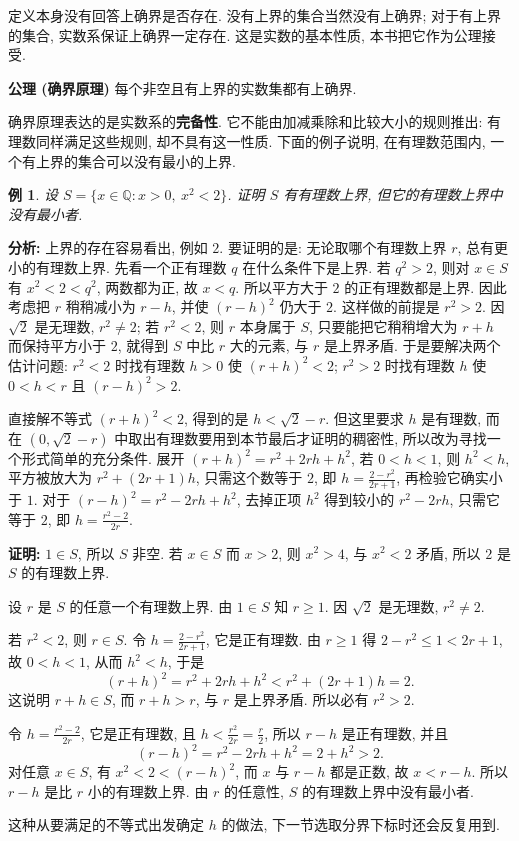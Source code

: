 \documentclass[UTF8,openany]{ctexbook}
\theoremstyle{chinesetextbook}
\newtheorem{example}{例}[section]
\newenvironment{cnproof}{\par\indent\textbf{证明:} \ignorespaces}{\par}
\begin{document}
定义本身没有回答上确界是否存在. 没有上界的集合当然没有上确界; 对于有上界的集合, 实数系保证上确界一定存在. 这是实数的基本性质, 本书把它作为公理接受.

\par\indent\textbf{公理 (确界原理)} 每个非空且有上界的实数集都有上确界.

确界原理表达的是实数系的\textbf{完备性}. 它不能由加减乘除和比较大小的规则推出: 有理数同样满足这些规则, 却不具有这一性质. 下面的例子说明, 在有理数范围内, 一个有上界的集合可以没有最小的上界.
\begin{example}
设 $S=\{x\in\mathbb Q:x>0,\ x^2<2\}$. 证明 $S$ 有有理数上界, 但它的有理数上界中没有最小者.
\end{example}
\par\indent\textbf{分析:} 上界的存在容易看出, 例如 $2$. 要证明的是: 无论取哪个有理数上界 $r$, 总有更小的有理数上界. 先看一个正有理数 $q$ 在什么条件下是上界. 若 $q^2>2$, 则对 $x\in S$ 有 $x^2<2<q^2$, 两数都为正, 故 $x<q$. 所以平方大于 $2$ 的正有理数都是上界. 因此考虑把 $r$ 稍稍减小为 $r-h$, 并使 $(r-h)^2$ 仍大于 $2$. 这样做的前提是 $r^2>2$. 因 $\sqrt2$ 是无理数, $r^2\ne2$; 若 $r^2<2$, 则 $r$ 本身属于 $S$, 只要能把它稍稍增大为 $r+h$ 而保持平方小于 $2$, 就得到 $S$ 中比 $r$ 大的元素, 与 $r$ 是上界矛盾. 于是要解决两个估计问题: $r^2<2$ 时找有理数 $h>0$ 使 $(r+h)^2<2$; $r^2>2$ 时找有理数 $h$ 使 $0<h<r$ 且 $(r-h)^2>2$.

直接解不等式 $(r+h)^2<2$, 得到的是 $h<\sqrt2-r$. 但这里要求 $h$ 是有理数, 而在 $(0,\sqrt2-r)$ 中取出有理数要用到本节最后才证明的稠密性, 所以改为寻找一个形式简单的充分条件. 展开 $(r+h)^2=r^2+2rh+h^2$, 若 $0<h<1$, 则 $h^2<h$, 平方被放大为 $r^2+(2r+1)h$, 只需这个数等于 $2$, 即 $\displaystyle h=\frac{2-r^2}{2r+1}$, 再检验它确实小于 $1$. 对于 $(r-h)^2=r^2-2rh+h^2$, 去掉正项 $h^2$ 得到较小的 $r^2-2rh$, 只需它等于 $2$, 即 $\displaystyle h=\frac{r^2-2}{2r}$.
\begin{cnproof}
$1\in S$, 所以 $S$ 非空. 若 $x\in S$ 而 $x>2$, 则 $x^2>4$, 与 $x^2<2$ 矛盾, 所以 $2$ 是 $S$ 的有理数上界.

设 $r$ 是 $S$ 的任意一个有理数上界. 由 $1\in S$ 知 $r\ge1$. 因 $\sqrt2$ 是无理数, $r^2\ne2$.

若 $r^2<2$, 则 $r\in S$. 令 $\displaystyle h=\frac{2-r^2}{2r+1}$, 它是正有理数. 由 $r\ge1$ 得 $2-r^2\le1<2r+1$, 故 $0<h<1$, 从而 $h^2<h$, 于是
\[
(r+h)^2=r^2+2rh+h^2<r^2+(2r+1)h=2.
\]
这说明 $r+h\in S$, 而 $r+h>r$, 与 $r$ 是上界矛盾. 所以必有 $r^2>2$.

令 $\displaystyle h=\frac{r^2-2}{2r}$, 它是正有理数, 且 $\displaystyle h<\frac{r^2}{2r}=\frac r2$, 所以 $r-h$ 是正有理数, 并且
\[
(r-h)^2=r^2-2rh+h^2=2+h^2>2.
\]
对任意 $x\in S$, 有 $x^2<2<(r-h)^2$, 而 $x$ 与 $r-h$ 都是正数, 故 $x<r-h$. 所以 $r-h$ 是比 $r$ 小的有理数上界. 由 $r$ 的任意性, $S$ 的有理数上界中没有最小者.
\end{cnproof}
这种从要满足的不等式出发确定 $h$ 的做法, 下一节选取分界下标时还会反复用到.
\end{document}
